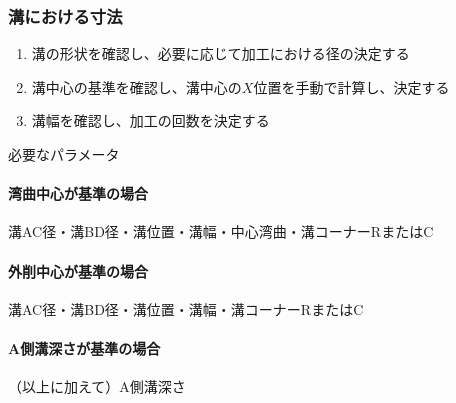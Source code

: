 \subsubsection{溝における寸法}
\begin{enumerate}
\item {}溝の形状を確認し、必要に応じて加工における径の決定する
\item {}溝中心の基準を確認し、溝中心の$X$位置を手動で計算し、決定する
\item {}溝幅を確認し、加工の回数を決定する
\end{enumerate}
\begin{Parameter}{必要なパラメータ}
\paragraph*{湾曲中心が基準の場合}
溝AC径・溝BD径・溝位置・溝幅・中心湾曲・溝コーナーRまたはC
\tcbline*
\paragraph*{外削中心が基準の場合}
溝AC径・溝BD径・溝位置・溝幅・溝コーナーRまたはC
\tcbline*
\paragraph*{A側溝深さが基準の場合}
（以上に加えて）A側溝深さ
\end{Parameter}

